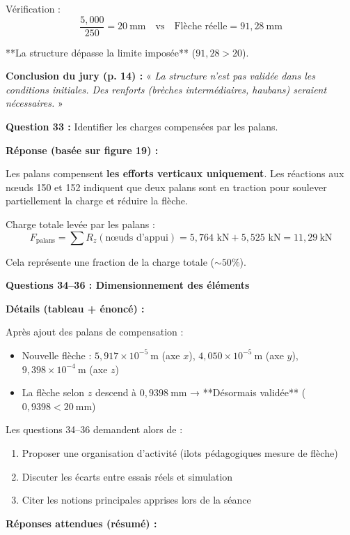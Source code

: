 \documentclass[12pt,a4paper,twoside]{article}
\begin{document}
\begin{correction}
  Vérification :
  \[
    \frac{5{,}000}{250} = 20~\text{mm} \quad \text{vs} \quad \text{Flèche réelle} = 91{,}28~\text{mm}
  \]

  **La structure dépasse la limite imposée** ($91{,}28 > 20$).

  \textbf{Conclusion du jury (p. 14) :} « \textit{La structure n'est pas validée dans les conditions initiales. Des renforts (brèches intermédiaires, haubans) seraient nécessaires.} »

  \textbf{Question 33 :} Identifier les charges compensées par les palans.

  \textbf{Réponse (basée sur figure 19) :}

  Les palans compensent \textbf{les efforts verticaux uniquement}. Les réactions aux nœuds 150 et 152 indiquent que deux palans sont en traction pour soulever partiellement la charge et réduire la flèche.

  Charge totale levée par les palans :
  \[
    F_{\text{palans}} = \sum R_z(\text{nœuds d'appui}) = 5{,}764 \text{ kN} + 5{,}525 \text{ kN} = 11{,}29~\text{kN}
  \]

  Cela représente une fraction de la charge totale ($\sim 50\%$).

  \textbf{Questions 34--36 : Dimensionnement des éléments}

  \textbf{Détails (tableau + énoncé) :}

  Après ajout des palans de compensation :
  \begin{itemize}
    \item Nouvelle flèche : $5{,}917 \times 10^{-5}~\text{m}$ (axe $x$), $4{,}050 \times 10^{-5}~\text{m}$ (axe $y$), $9{,}398 \times 10^{-4}~\text{m}$ (axe $z$)
    \item La flèche selon $z$ descend à $0{,}9398~\text{mm}$ → **Désormais validée** ($0{,}9398 < 20~\text{mm}$)
  \end{itemize}

  Les questions 34--36 demandent alors de :
  \begin{enumerate}
    \item Proposer une organisation d'activité (ilots pédagogiques mesure de flèche)
    \item Discuter les écarts entre essais réels et simulation
    \item Citer les notions principales apprises lors de la séance
  \end{enumerate}

  \textbf{Réponses attendues (résumé) :}


\end{correction}
\end{document}
